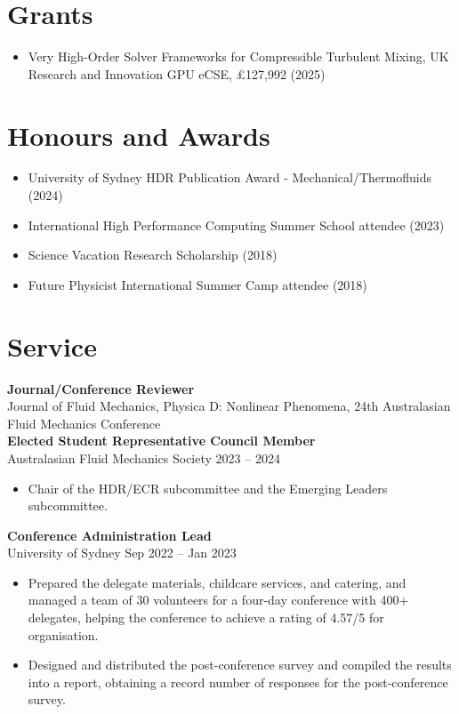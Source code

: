 \documentclass[11pt]{article}       %
\begin{document}
\vspace{-16.5pt}
\section*{Grants}
\begin{itemize}
    \item Very High-Order Solver Frameworks for Compressible Turbulent Mixing, UK Research and Innovation GPU eCSE, £127,992 (2025)
\end{itemize}

\vspace{-16.5pt}
\section*{Honours and Awards}
\begin{itemize}
    \item University of Sydney HDR Publication Award - Mechanical/Thermofluids (2024)
    \item International High Performance Computing Summer School attendee (2023)
    \item Science Vacation Research Scholarship (2018)
    \item Future Physicist International Summer Camp attendee (2018)
\end{itemize}

\vspace{-16.5pt}
\section{Service}

\textbf{Journal/Conference Reviewer}\\
Journal of Fluid Mechanics, Physica D: Nonlinear Phenomena, 24th Australasian Fluid Mechanics Conference\\

\vspace{9pt}
\textbf{Elected Student Representative Council Member}\\
Australasian Fluid Mechanics Society \hfill 2023 -- 2024
\begin{itemize}
    \item Chair of the HDR/ECR subcommittee and the Emerging Leaders subcommittee.
\end{itemize}

\textbf{Conference Administration Lead}\\
University of Sydney \hfill Sep 2022 -- Jan 2023
\begin{itemize}
  \item Prepared the delegate materials, childcare services, and catering, and managed a team of 30 volunteers for a four-day conference with 400+ delegates, helping the conference to achieve a rating of 4.57/5 for organisation.
  \item Designed and distributed the post-conference survey and compiled the results into a report, obtaining a record number of responses for the post-conference survey.
\end{itemize}
\end{document}
